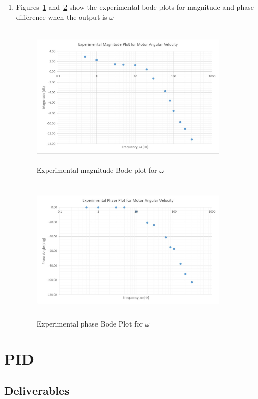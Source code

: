 \documentclass[letterpaper, 11pt, openany]{book}
\begin{document}
\begin{enumerate}
\item Figures~\ref{fig:MagBode} and~\ref{fig:PhaseBode} show the experimental 
bode plots for magnitude and phase difference when the output is $\omega$
\begin{figure}[htbp]
\centering
\includegraphics[width=0.9\textwidth, height = 7cm]{graphics/MagBode.jpg} 
\caption{Experimental magnitude Bode plot for $\omega$}\label{fig:MagBode}
\end{figure}

\begin{figure}[htbp]
\centering
\includegraphics[width=0.9\textwidth, height = 7cm]{graphics/PhaseBode.jpg} 
\caption{Experimental phase Bode Plot for $\omega$}\label{fig:PhaseBode}
\end{figure}

\end{enumerate}

\chapter{PID}
\section{Deliverables}
\end{document}

